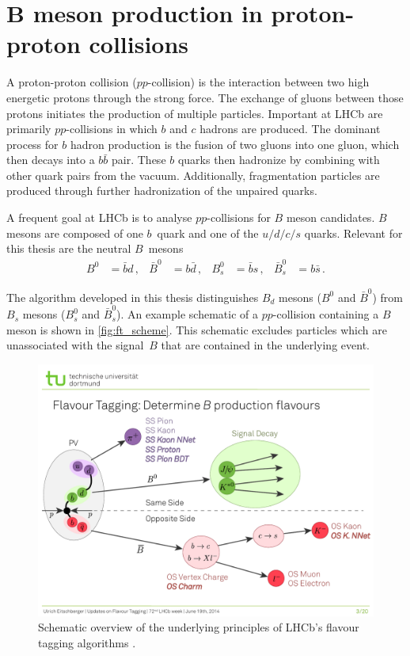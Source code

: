 \section[\texorpdfstring{$B$}{B} meson production in proton-proton collisions]{\texorpdfstring{$\symbf{B}$}{B} meson production in proton-proton collisions}
\label{sec:B_mesons}

A proton-proton collision ($pp$-collision) is the interaction between two high energetic protons through the strong force.
The exchange of gluons between those protons initiates the production of multiple particles. 
Important at LHCb are primarily $pp$-collisions in which $b$ and $c$ hadrons are produced.
The dominant process for $b$ hadron production is the fusion of two gluons into one gluon, which then decays into a $b\bar{b}$ pair.
These $b$ quarks then hadronize by combining with other quark pairs from the vacuum. 
Additionally, fragmentation particles are produced through further hadronization of the unpaired quarks.

A frequent goal at LHCb is to analyse $pp$-collisions for $B$ meson candidates. %
$B$ mesons are composed of one $b$~quark and one of the $u/d/c/s$ quarks.
Relevant for this thesis are the neutral $B$~mesons
\begin{align*}
    B^0 &= \bar{b}d \, , & \bar{B}^0 &= b\bar{d} \, , & B_s^0 &= \bar{b}s \, , & \bar{B}_s^0 &= b\bar{s} \, .
\end{align*}

The algorithm developed in this thesis distinguishes $B_d$ mesons ($B^0$ and $\bar{B}^0$) from $B_s$ mesons ($B_s^0$ and $\bar{B}_s^0$).
An example schematic of a $pp$-collision containing a $B$ meson is shown in \autoref{fig:ft_scheme}. 
This schematic excludes particles which are unassociated with the signal~$B$ that are contained in the underlying event.

\begin{figure}
    \centering
    \includegraphics[width=\textwidth]{images/FlavourTaggingScheme.pdf}
    \caption{Schematic overview of the underlying principles of LHCb's flavour tagging algorithms \cite{ft_scheme}.}
    \label{fig:ft_scheme}
\end{figure}

